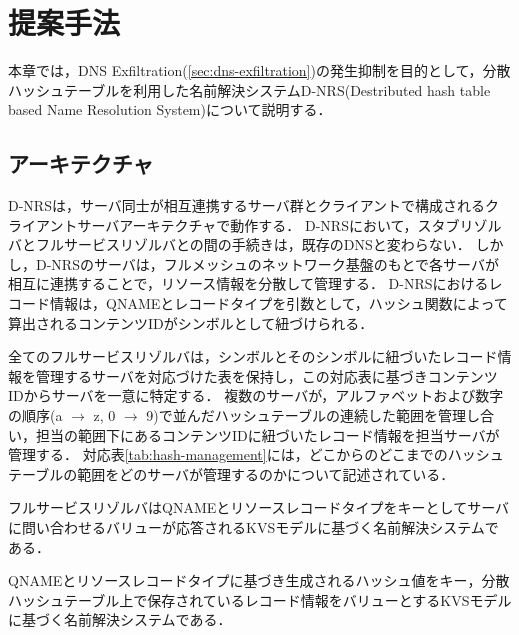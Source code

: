 \section{提案手法}

本章では，DNS Exfiltration(\ref{sec:dns-exfiltration})の発生抑制を目的として，分散ハッシュテーブルを利用した名前解決システムD-NRS(Destributed hash table based Name Resolution System)について説明する．

\subsection{アーキテクチャ}
D-NRSは，サーバ同士が相互連携するサーバ群とクライアントで構成されるクライアントサーバアーキテクチャで動作する．
D-NRSにおいて，スタブリゾルバとフルサービスリゾルバとの間の手続きは，既存のDNSと変わらない．
しかし，D-NRSのサーバは，フルメッシュのネットワーク基盤のもとで各サーバが相互に連携することで，リソース情報を分散して管理する．
D-NRSにおけるレコード情報は，QNAMEとレコードタイプを引数として，ハッシュ関数によって算出されるコンテンツIDがシンボルとして紐づけられる．

全てのフルサービスリゾルバは，シンボルとそのシンボルに紐づいたレコード情報を管理するサーバを対応づけた表を保持し，この対応表に基づきコンテンツIDからサーバを一意に特定する．
複数のサーバが，アルファベットおよび数字の順序(a $\rightarrow$ z, 0 $\rightarrow$ 9)で並んだハッシュテーブルの連続した範囲を管理し合い，担当の範囲下にあるコンテンツIDに紐づいたレコード情報を担当サーバが管理する．
対応表\ref{tab:hash-management}には，どこからのどこまでのハッシュテーブルの範囲をどのサーバが管理するのかについて記述されている．



フルサービスリゾルバはQNAMEとリソースレコードタイプをキーとしてサーバに問い合わせるバリューが応答されるKVSモデルに基づく名前解決システムである．

QNAMEとリソースレコードタイプに基づき生成されるハッシュ値をキー，分散ハッシュテーブル上で保存されているレコード情報をバリューとするKVSモデルに基づく名前解決システムである．

